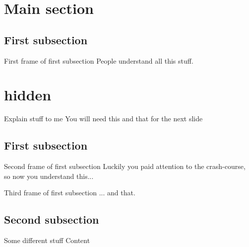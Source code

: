 \documentclass[a4paper]{beamer}
\begin{document}
    \section{Main section}
        \subsection{First subsection}
            \begin{frame}{First frame of first subsection}
            People understand all this stuff.
        \end{frame}
 \addtocounter{section}{42}
 \section[]{hidden}
        \begin{frame}{Explain stuff to me}
        You will need this and that for the next slide
        \end{frame}
    \addtocounter{section}{-42}
    \subsection{First subsection}
        \addtocounter{subsectionslide}{1}
        \begin{frame}{Second frame of first subsection}
        Luckily you paid attention to the crash-course, so now you understand this...
        \end{frame}
        \begin{frame}{Third frame of first subsection}
        ... and that.
        \end{frame}
    \subsection{Second subsection}
        \begin{frame}{Some different stuff}
        Content
        \end{frame}
\end{document}

